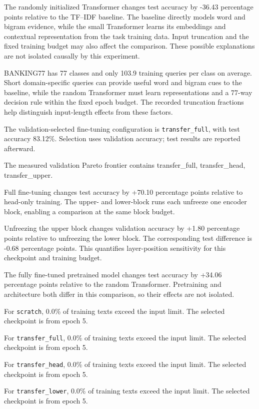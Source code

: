 The randomly initialized Transformer changes test accuracy by -36.43 percentage points relative to the TF--IDF baseline. The baseline directly models word and bigram evidence, while the small Transformer learns its embeddings and contextual representation from the task training data. Input truncation and the fixed training budget may also affect the comparison. These possible explanations are not isolated causally by this experiment.

BANKING77 has 77 classes and only 103.9 training queries per class on average. Short domain-specific queries can provide useful word and bigram cues to the baseline, while the random Transformer must learn representations and a 77-way decision rule within the fixed epoch budget. The recorded truncation fractions help distinguish input-length effects from these factors.

The validation-selected fine-tuning configuration is \texttt{transfer\_full}, with test accuracy 83.12\%. Selection uses validation accuracy; test results are reported afterward.

The measured validation Pareto frontier contains transfer\_full, transfer\_head, transfer\_upper.

Full fine-tuning changes test accuracy by +70.10 percentage points relative to head-only training. The upper- and lower-block runs each unfreeze one encoder block, enabling a comparison at the same block budget.

Unfreezing the upper block changes validation accuracy by +1.80 percentage points relative to unfreezing the lower block. The corresponding test difference is -0.68 percentage points. This quantifies layer-position sensitivity for this checkpoint and training budget.

The fully fine-tuned pretrained model changes test accuracy by +34.06 percentage points relative to the random Transformer. Pretraining and architecture both differ in this comparison, so their effects are not isolated.

For \texttt{scratch}, 0.0\% of training texts exceed the input limit. The selected checkpoint is from epoch 5.

For \texttt{transfer\_full}, 0.0\% of training texts exceed the input limit. The selected checkpoint is from epoch 5.

For \texttt{transfer\_head}, 0.0\% of training texts exceed the input limit. The selected checkpoint is from epoch 5.

For \texttt{transfer\_lower}, 0.0\% of training texts exceed the input limit. The selected checkpoint is from epoch 5.

